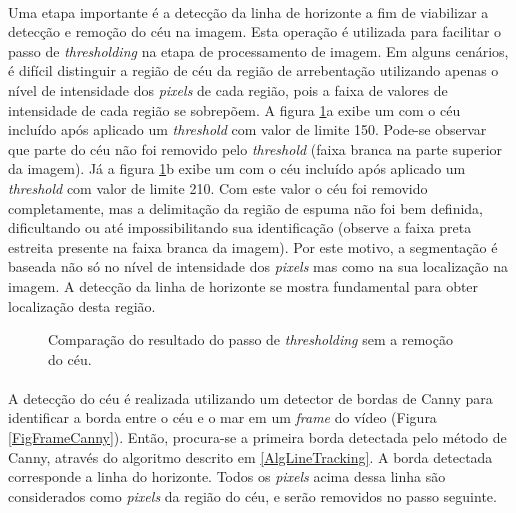 \paragraph{}Uma etapa importante é a detecção da linha de horizonte a fim de viabilizar a detecção e remoção do céu na imagem. Esta operação é utilizada para facilitar o passo de \textit{thresholding} na etapa de processamento de imagem. Em alguns cenários, é difícil distinguir a região de céu da região de arrebentação utilizando apenas o nível de intensidade dos \textit{pixels} de cada região, pois a faixa de valores de intensidade de cada região se sobrepõem. A figura \ref{FigTimestackFail}a exibe um \timestack com o céu incluído após aplicado um \textit{threshold} com valor de limite 150. Pode-se observar que parte do céu não foi removido pelo \textit{threshold} (faixa branca na parte superior da imagem). Já a figura \ref{FigTimestackFail}b exibe um \timestack com o céu incluído após aplicado um \textit{threshold} com valor de limite 210. Com este valor o céu foi removido completamente, mas a delimitação da região de espuma não foi bem definida, dificultando ou até impossibilitando sua identificação (observe a faixa preta estreita presente na faixa branca da imagem). Por este motivo, a segmentação é baseada não só no nível de intensidade dos \textit{pixels} mas como na sua localização na imagem. A detecção da linha de horizonte se mostra fundamental para obter localização desta região.

\begin{figure}[h]
  \centering
  \qquad
  \caption[\small{Comparação do resultado do passo de \textit{thresholding} sem a remoção do céu.}]{\small{Comparação do resultado do passo de \textit{thresholding} sem a remoção do céu.}}
  \label{FigTimestackFail}
\end{figure}

\paragraph{}A detecção do céu é realizada utilizando um detector de bordas de Canny para identificar a borda entre o céu e o mar em um \textit{frame} do vídeo (Figura \ref{FigFrameCanny}). Então, procura-se a primeira borda detectada pelo método de Canny, através do algoritmo descrito em \ref{AlgLineTracking}. A borda detectada corresponde a linha do horizonte. Todos os \textit{pixels} acima dessa linha são considerados como \textit{pixels} da região do céu, e serão removidos no passo seguinte.

